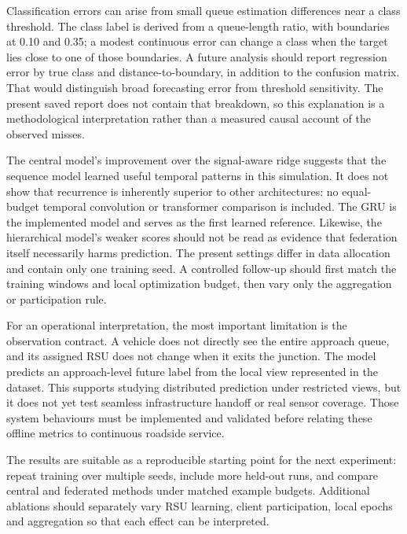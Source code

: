 Classification errors can arise from small queue estimation differences near a class threshold. The class label is derived from a queue-length ratio, with boundaries at 0.10 and 0.35; a modest continuous error can change a class when the target lies close to one of those boundaries. A future analysis should report regression error by true class and distance-to-boundary, in addition to the confusion matrix. That would distinguish broad forecasting error from threshold sensitivity. The present saved report does not contain that breakdown, so this explanation is a methodological interpretation rather than a measured causal account of the observed misses.

The central model's improvement over the signal-aware ridge suggests that the sequence model learned useful temporal patterns in this simulation. It does not show that recurrence is inherently superior to other architectures: no equal-budget temporal convolution or transformer comparison is included. The GRU is the implemented model and serves as the first learned reference. Likewise, the hierarchical model's weaker scores should not be read as evidence that federation itself necessarily harms prediction. The present settings differ in data allocation and contain only one training seed. A controlled follow-up should first match the training windows and local optimization budget, then vary only the aggregation or participation rule.

For an operational interpretation, the most important limitation is the observation contract. A vehicle does not directly see the entire approach queue, and its assigned RSU does not change when it exits the junction. The model predicts an approach-level future label from the local view represented in the dataset. This supports studying distributed prediction under restricted views, but it does not yet test seamless infrastructure handoff or real sensor coverage. Those system behaviours must be implemented and validated before relating these offline metrics to continuous roadside service.

The results are suitable as a reproducible starting point for the next experiment: repeat training over multiple seeds, include more held-out runs, and compare central and federated methods under matched example budgets. Additional ablations should separately vary RSU learning, client participation, local epochs and aggregation so that each effect can be interpreted.
